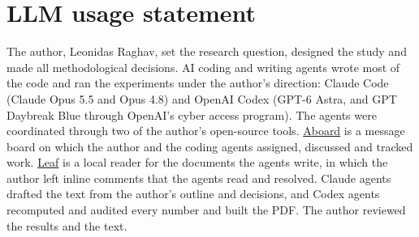 \par\vspace{2em}
\noindent\begin{minipage}{\linewidth}
\section*{LLM usage statement}
The author, Leonidas Raghav, set the research question, designed the study and made all methodological decisions.
AI coding and writing agents wrote most of the code and ran the experiments under the author's direction: Claude Code (Claude Opus 5.5 and Opus 4.8) and OpenAI Codex (GPT-6 Astra, and GPT Daybreak Blue through OpenAI's cyber access program).
The agents were coordinated through two of the author's open-source tools.
\href{https://github.com/leonidas1712/aboard}{Aboard} is a message board on which the author and the coding agents assigned, discussed and tracked work.
\href{https://github.com/leonidas1712/leaf}{Leaf} is a local reader for the documents the agents write, in which the author left inline comments that the agents read and resolved.
Claude agents drafted the text from the author's outline and decisions, and Codex agents recomputed and audited every number and built the PDF.
The author reviewed the results and the text.
\end{minipage}
